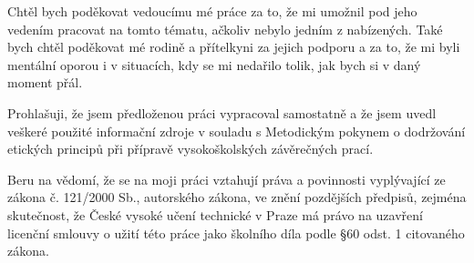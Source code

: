 \documentclass[czech,bachelor,unicode,oneside]{ctufit-thesis}
\theoremstyle{plain}
\theoremstyle{definition}
\theoremstyle{remark}
\numberwithin{theorem}{chapter}
\begin{document}
 
\frontmatter\frontmatterinit %


\thispagestyle{empty}\cleardoublepage\maketitle %

\imprintpage %

\tableofcontents %
\listoffigures %

\begin{acknowledgmentpage}
	Chtěl bych poděkovat vedoucímu mé práce za to, že mi umožnil pod jeho vedením pracovat na tomto tématu, ačkoliv nebylo jedním z nabízených. Také bych chtěl poděkovat mé rodině a přítelkyni za jejich podporu a za to, že mi byli mentální oporou i v situacích, kdy se mi nedařilo tolik, jak bych si v daný moment přál.
\end{acknowledgmentpage} 


\begin{declarationpage}
Prohlašuji, že jsem předloženou práci vypracoval samostatně a že jsem uvedl veškeré použité informační zdroje v souladu s Metodickým pokynem o dodržování etických principů při přípravě vysokoškolských závěrečných prací.

Beru na vědomí, že se na moji práci vztahují práva a povinnosti vyplývající ze zákona č. 121/2000 Sb., autorského zákona, ve znění pozdějších předpisů, zejména skutečnost, že České vysoké učení technické v Praze má právo na uzavření licenční smlouvy o užití této práce jako školního díla podle §60 odst. 1 citovaného zákona.
\end{declarationpage}
\end{document}
